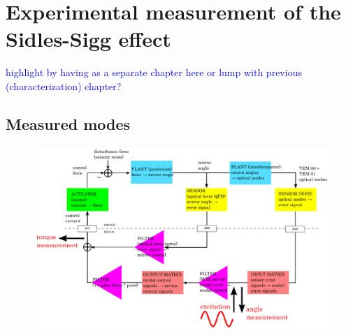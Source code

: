 \chapter{Experimental measurement of the Sidles-Sigg effect}
\textcolor{blue}{highlight by having as a separate chapter here or
  lump with previous (characterization) chapter?}

\section{Measured modes}


\begin{figure}
\begin{centering}
\includegraphics[width=1.0\textwidth]{figures/ascservo_measurement.pdf}
\caption{}
\label{}
\end{centering}
\end{figure}

